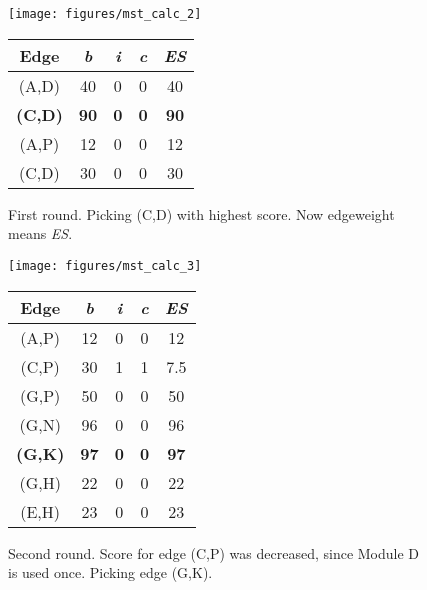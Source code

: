 	\begin{figure}[h!]
	  \centering
	  \begin{minipage}{0.4\textwidth}
	    \texttt{[image: figures/mst\_calc\_2]}
	  \end{minipage}
	  \qquad
	  \begin{minipage}{0.49\textwidth}
	    \begin{tabular}{c||c|c|c||c}
	      Edge & \textit{b} & \textit{i} & \textit{c} & \textit{ES}\\ \hline\hline
	      (A,D) & 40 & 0 & 0 & 40 \\ \hline
	      \textbf{(C,D)} & \textbf{90} & \textbf{0} & \textbf{0} & \textbf{90} \\ \hline
	      (A,P) & 12 & 0 & 0 & 12 \\ \hline
	      (C,D) & 30 & 0 & 0 & 30 \\ \hline
	    \end{tabular}
	  \end{minipage}
	  \caption{First round. Picking (C,D) with highest score. Now edgeweight means \textit{ES}.}
	  \label{fig:mst_calc_2}
	\end{figure}
	
	\begin{figure}[h!]
	  \centering
	  \begin{minipage}{0.5\textwidth}
	    \texttt{[image: figures/mst\_calc\_3]}
	  \end{minipage}
	  \begin{minipage}{0.35\textwidth}
	    \begin{tabular}{c||c|c|c||c}
	      Edge & \textit{b} & \textit{i} & \textit{c} & \textit{ES}\\ \hline\hline
	      (A,P) & 12 & 0 & 0 & 12 \\ \hline
	      (C,P) & 30 & 1 & 1 & 7.5 \\ \hline
	      (G,P) & 50 & 0 & 0 & 50 \\ \hline
	      (G,N) & 96 & 0 & 0 & 96 \\ \hline
	      \textbf{(G,K)} & \textbf{97} & \textbf{0} & \textbf{0} & \textbf{97} \\ \hline
	      (G,H) & 22 & 0 & 0 & 22 \\ \hline
	      (E,H) & 23 & 0 & 0 & 23 \\ \hline
	    \end{tabular}
	  \end{minipage}
	  \caption{Second round. Score for edge (C,P) was decreased, since Module D is used once. Picking edge (G,K).}
	  \label{fig:mst_calc_3}
	\end{figure}
      
